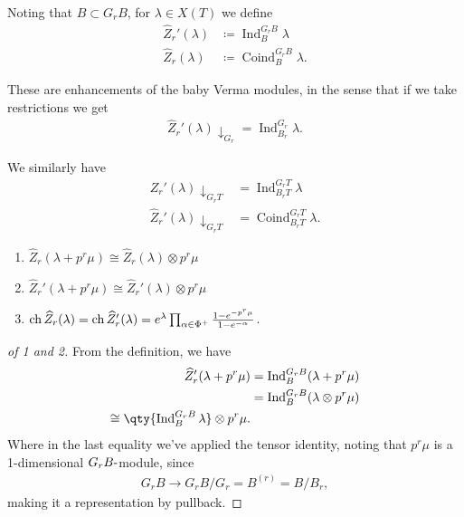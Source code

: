 Noting that \(B\subset G_r B\), for \(\lambda \in X(T)\) we define
\begin{align*}  
\widehat{Z}_r' (\lambda) &\coloneqq\operatorname{Ind}_B^{G_r B} \lambda \\
\widehat{Z}_r (\lambda) &\coloneqq\operatorname{Coind}_B^{G_r B} \lambda
.\end{align*}

These are enhancements of the baby Verma modules, in the sense that if
we take restrictions we get
\begin{align*}  
\widehat{Z}_r' (\lambda) \downarrow_{G_r} = \operatorname{Ind}_{B_r}^{G_r} \lambda
.\end{align*}

We similarly have
\begin{align*}  
{Z}_r' (\lambda) \downarrow_{G_r T} &= \operatorname{Ind}_{B_r T}^{G_r T} \lambda \\
\widehat{Z}_r' (\lambda) \downarrow_{G_r T} &= \operatorname{Coind}_{B_r T}^{G_r T} \lambda
.\end{align*}

\begin{proposition}[?]

\envlist

\begin{enumerate}
\def\labelenumi{\arabic{enumi}.}
\tightlist
\item
  \(\widehat{Z}_r(\lambda + p^r \mu) \cong \widehat{Z}_r(\lambda) \otimes p^r \mu\)
\item
  \(\widehat{Z}_r' (\lambda + p^r \mu) \cong \widehat{Z}_r' (\lambda) \otimes p^r \mu\)
\item
  \(\operatorname{ch}\widehat{Z}_r(\lambda) = \operatorname{ch}\widehat{Z}_r' (\lambda) = e^\lambda \prod_{\alpha\in\Phi^+} {1 - e^{-p^r\mu} \over 1 - e^{-\alpha}}\).
\end{enumerate}

\end{proposition}

\begin{proof}[of 1 and 2]

From the definition, we have
\begin{align*}  
\widehat{Z}_r'(\lambda + p^r \mu)
&= \operatorname{Ind}_{B}^{G_r B} (\lambda + p^r \mu) \\
&= \operatorname{Ind}_{B}^{G_r B} (\lambda \otimes p^r \mu) \\
\cong \qty{\operatorname{Ind}_B^{G_r B} \lambda} \otimes p^r\mu
.\end{align*}
Where in the last equality we've applied the tensor identity, noting
that \(p^r\mu\) is a 1-dimensional \(G_r B{\hbox{-}}\)module, since
\begin{align*}  
G_r B \to G_r B/G_r = B^{(r)} = B/B_r
,\end{align*}
making it a representation by pullback.

\end{proof}


